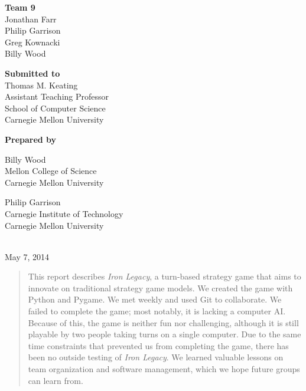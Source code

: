 \documentclass{article}
\begin{document}
\vfill

\begin{center}
\textbf{Team 9}\\
Jonathan Farr\\
Philip Garrison\\
Greg Kownacki\\
Billy Wood
\end{center}

\vfill

\begin{center}
\textbf{Submitted to}\\
Thomas M. Keating\\
Assistant Teaching Professor\\
School of Computer Science\\
Carnegie Mellon University
\end{center}

\vfill

\begin{center}
\textbf{Prepared by}\\
\begin{minipage}[c][3.7em][t]{.45\textwidth}
\begin{center}
Billy Wood\\
Mellon College of Science\\
Carnegie Mellon University
\end{center}
\end{minipage}
\begin{minipage}[c][3.7em][t]{.45\textwidth}
\begin{center}
Philip Garrison\\
Carnegie Institute of Technology\\
Carnegie Mellon University
\end{center}
\end{minipage}\\
May 7, 2014
\end{center}

\vfill

\begin{abstract}
This report describes \emph{Iron Legacy}, a turn-based strategy game that aims 
to innovate on traditional strategy game models. We created the game with 
Python and Pygame. We met weekly and used Git to collaborate. We failed to 
complete the game; most notably, it is lacking a computer AI. Because of this, 
the game is neither fun nor challenging, although it is still playable by two
people taking turns on a single computer. Due to the same time constraints that 
prevented us from completing the game, there has been no outside testing of 
\emph{Iron Legacy}. We learned valuable lessons on team organization and 
software management, which we hope future groups can learn from.
\end{abstract}
\end{document}
